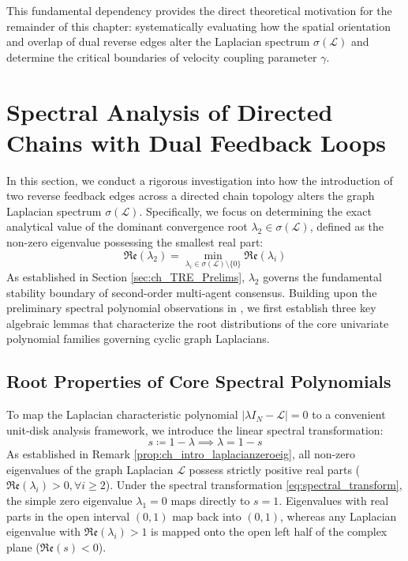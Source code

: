 This fundamental dependency provides the direct theoretical motivation for the remainder of this chapter: systematically evaluating how the spatial orientation and overlap of dual reverse edges alter the Laplacian spectrum $\sigma(\mathcal{L})$ and determine the critical boundaries of velocity coupling parameter $\gamma$.

\section{Spectral Analysis of Directed Chains with Dual Feedback Loops}\label{sec:ch_TRE_MainResults}
In this section, we conduct a rigorous investigation into how the introduction of two reverse feedback edges across a directed chain topology alters the graph Laplacian spectrum $\sigma(\mathcal{L})$. Specifically, we focus on determining the exact analytical value of the dominant convergence root $\lambda_2 \in \sigma(\mathcal{L})$, defined as the non-zero eigenvalue possessing the smallest real part:
\begin{equation}
	\mathfrak{Re}(\lambda_2) = \min_{\lambda_i \in \sigma(\mathcal{L}) \setminus \{0\}} \mathfrak{Re}(\lambda_i)
\end{equation}
As established in Section \ref{sec:ch_TRE_Prelims}, $\lambda_2$ governs the fundamental stability boundary of second-order multi-agent consensus. Building upon the preliminary spectral polynomial observations in \cite{hao2019role}, we first establish three key algebraic lemmas that characterize the root distributions of the core univariate polynomial families governing cyclic graph Laplacians.

\subsection{Root Properties of Core Spectral Polynomials}

To map the Laplacian characteristic polynomial $|\lambda I_N - \mathcal{L}| = 0$ to a convenient unit-disk analysis framework, we introduce the linear spectral transformation:
\begin{equation}\label{eq:spectral_transform}
	s \coloneqq 1 - \lambda \implies \lambda = 1 - s
\end{equation}
As established in Remark \ref{prop:ch_intro_laplacianzeroeig}, all non-zero eigenvalues of the graph Laplacian $\mathcal{L}$ possess strictly positive real parts ($\mathfrak{Re}(\lambda_i) > 0, \forall i \ge 2$). Under the spectral transformation \eqref{eq:spectral_transform}, the simple zero eigenvalue $\lambda_1 = 0$ maps directly to $s = 1$. Eigenvalues with real parts in the open interval $(0, 1)$ map back into $(0, 1)$, whereas any Laplacian eigenvalue with $\mathfrak{Re}(\lambda_i) > 1$ is mapped onto the open left half of the complex plane ($\mathfrak{Re}(s) < 0$). 


